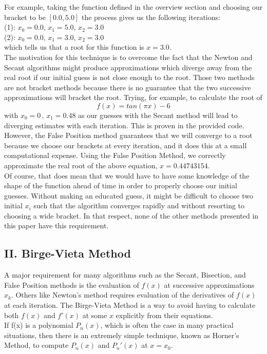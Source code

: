 \documentclass[12pt, oneside]{article}
\begin{document}
For example, taking the function defined in the overview section and choosing our bracket to be $[0.0,5.0]$ the process gives us the following iterations:\\
(1):   $x_0=0.0$, $x_1=5.0$, $x_2=3.0$\\
(2):   $x_0=0.0$, $x_1=3.0$, $x_2=3.0$\\
which tells us that a root for this function is $x=3.0$.\\

The motivation for this technique is to overcome the fact that the Newton and Secant algorithms might produce approximations which diverge away from the real root if our initial guess is not close enough to the root. Those two methods are not bracket methods because there is no guarantee that the two successive approximations will bracket the root. Trying, for example, to calculate the root of 
\[f(x) = tan(\pi x)-6\] 
with $x_0=0\,,\,x_1=0.48$ as our guesses with the Secant method will lead to diverging estimates with each iteration. This is proven in the provided code.  However, the False Position method guarantees that we will converge to a root because we choose our brackets at every iteration, and it does this at a small computational expense. Using the False Position Method, we correctly approximate the real root of the above equation, $x=0.44743154$.\\
Of course, that does mean that we would have to have some knowledge of the shape of the function ahead of time in order to properly choose our initial guesses. Without making an educated guess, it might be difficult to choose two initial $x_i$ such that the algorithm converges rapidly and without resorting to choosing a wide bracket. In that respect, none of the other methods presented in this paper have this requirement.\\

\subsection*{II. Birge-Vieta Method}
A major requirement for many algorithms such as the Secant, Bisection, and False Position methods is the evaluation of $f(x)$ at successive approximations $x_k$. Others like Newton's method requires evaluation of the derivatives of $f(x)$ at each iteration. The Birge-Vieta Method is a way to avoid having to calculate both $f(x)$ and $f'(x)$ at some $x$ explicitly from their equations.\\

If f(x) is a polynomial $P_n(x)$, which is often the case in many practical situations, then there is an extremely simple technique, known as Horner's Method, to compute $P_n(x)$ and $P_n'(x)$ at $x = x_0$. 
\end{document}
